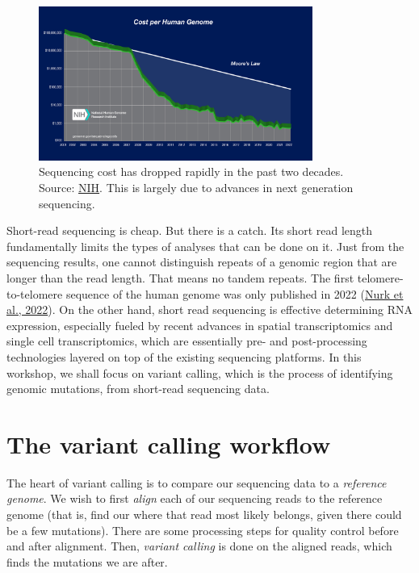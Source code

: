 \documentclass[12pt,letterpaper]{article}
\begin{document}
\begin{figure}
\centering
\includegraphics[width=0.8\textwidth]{genome_sequencing_cost.jpg}
\caption{Sequencing cost has dropped rapidly in the past two decades. Source: \href{https://www.genome.gov/about-genomics/fact-sheets/Sequencing-Human-Genome-cost}{NIH}. This is largely due to advances in next generation sequencing.}
\label{fig:genome-sequencing-cost}
\end{figure}

Short-read sequencing is cheap. But there is a catch. Its short read length fundamentally limits the types of analyses that can be done on it. Just from the sequencing results, one cannot distinguish repeats of a genomic region that are longer than the read length. That means no tandem repeats. The first telomere-to-telomere sequence of the human genome was only published in 2022 (\href{https://www.science.org/doi/10.1126/science.abj6987}{Nurk et al., 2022}). On the other hand, short read sequencing is effective determining RNA expression, especially fueled by recent advances in spatial transcriptomics and single cell transcriptomics, which are essentially pre- and post-processing technologies layered on top of the existing sequencing platforms. In this workshop, we shall focus on variant calling, which is the process of identifying genomic mutations, from short-read sequencing data.

\section{The variant calling workflow}

The heart of variant calling is to compare our sequencing data to a \textit{reference genome}. We wish to first \textit{align} each of our sequencing reads to the reference genome (that is, find our where that read most likely belongs, given there could be a few mutations). There are some processing steps for quality control before and after alignment. Then, \textit{variant calling} is done on the aligned reads, which finds the mutations we are after.
\end{document}
